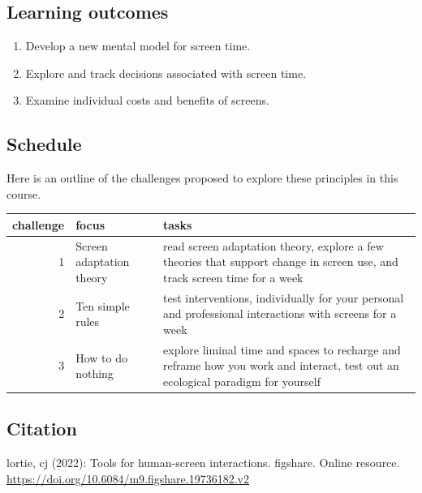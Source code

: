 \documentclass[
]{book}
\providecommand{\tightlist}{%
  \setlength{\itemsep}{0pt}\setlength{\parskip}{0pt}}
\begin{document}
\hypertarget{learning-outcomes}{%
\subsection*{Learning outcomes}\label{learning-outcomes}}

\begin{enumerate}
\def\labelenumi{\arabic{enumi}.}
\tightlist
\item
  Develop a new mental model for screen time.\\
\item
  Explore and track decisions associated with screen time.\\
\item
  Examine individual costs and benefits of screens.
\end{enumerate}

\hypertarget{schedule}{%
\subsection*{Schedule}\label{schedule}}

Here is an outline of the challenges proposed to explore these principles in this course.

\begin{tabular}{rll}
\toprule
challenge & focus & tasks\\
\midrule
1 & Screen adaptation theory & read screen adaptation theory, explore a few theories that support change in screen use, and track screen time for a week\\
2 & Ten simple rules & test interventions, individually for your personal and professional interactions with screens for a week\\
3 & How to do nothing & explore liminal time and spaces to recharge and reframe how you work and interact, test out an ecological paradigm for yourself\\
\bottomrule
\end{tabular}

\hypertarget{citation}{%
\subsection*{Citation}\label{citation}}

lortie, cj (2022): Tools for human-screen interactions. figshare. Online resource. \url{https://doi.org/10.6084/m9.figshare.19736182.v2}
\end{document}
